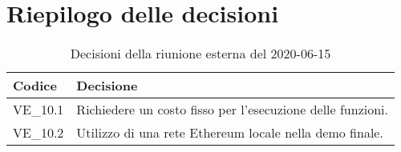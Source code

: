 \section{Riepilogo delle decisioni}
\begin{longtable}{
	 >{\centering}p{} >{}p{} }
	\caption{Decisioni della riunione esterna del 2020-06-15}\\

	\textbf{\color{white}Codice} &
	\textbf{\color{white}Decisione}
	\tabularnewline
	\endhead

	VE\_10.1 & Richiedere un costo fisso per l'esecuzione delle funzioni. \\
	VE\_10.2 & Utilizzo di una rete Ethereum\textit{\ped{G}} locale nella demo finale. \\
\end{longtable}
